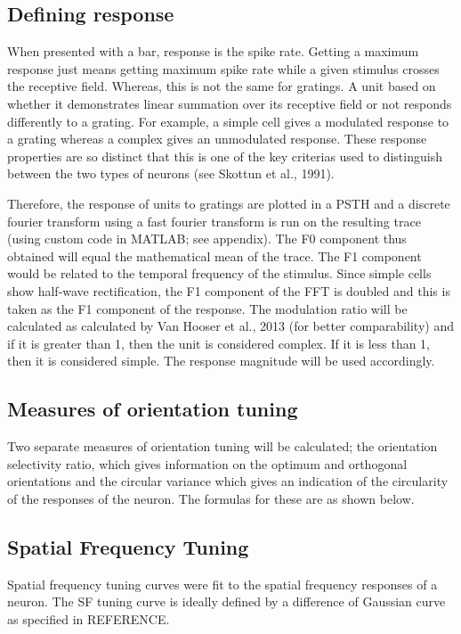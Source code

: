 	\subsection{Defining response}

		When presented with a bar, response is the spike rate. Getting a maximum response just means getting maximum spike rate while a given stimulus crosses the receptive field. Whereas, this is not the same for gratings. A unit based on whether it demonstrates linear summation over its receptive field or not responds differently to a grating. For example, a simple cell gives a modulated response to a grating whereas a complex gives an unmodulated response. These response properties are so distinct that this is one of the key criterias used to distinguish between the two types of neurons (see Skottun et al., 1991). 

		Therefore, the response of units to gratings are plotted in a PSTH and a discrete fourier transform using a fast fourier transform is run on the resulting trace (using custom code in MATLAB; see appendix). The F0 component thus obtained will equal the mathematical mean of the trace. The F1 component would be related to the temporal frequency of the stimulus. Since simple cells show half-wave rectification, the F1 component of the FFT is doubled and this is taken as the F1 component of the response. The modulation ratio will be calculated as calculated by Van Hooser et al., 2013 (for better comparability) and if it is greater than 1, then the unit is considered complex. If it is less than 1, then it is considered simple. The response magnitude will be used accordingly.

	\subsection{Measures of orientation tuning}

		Two separate measures of orientation tuning will be calculated; the orientation selectivity ratio, which gives information on the optimum and orthogonal orientations and the circular variance which gives an indication of the circularity of the responses of the neuron. The formulas for these are as shown below. 

	\subsection{Spatial Frequency Tuning}

		Spatial frequency tuning curves were fit to the spatial frequency responses of a neuron. The SF tuning curve is ideally defined by a difference of Gaussian curve as specified in REFERENCE. 
		
